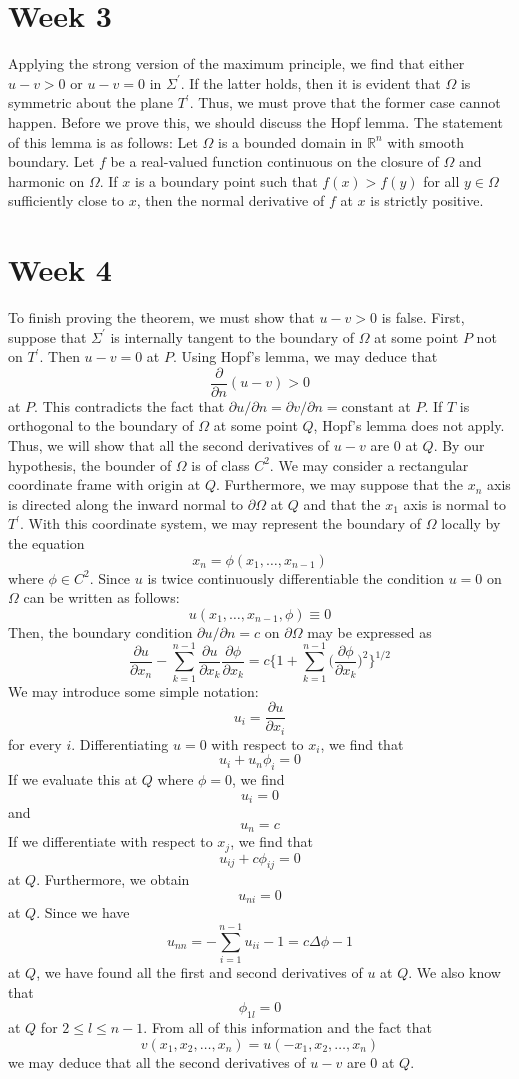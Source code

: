 \documentclass[12pt]{article}
\newcommand{\R}{\mathbb{R}}
\begin{document}
\section*{Week 3}
Applying the strong version of the maximum principle, we find that either $u-v > 0$ or $u-v = 0$ in $\Sigma^\prime$. If the latter holds, then it is evident that $\Omega$ is symmetric about the plane $T^\prime$. Thus, we must prove that the former case cannot happen. Before we prove this, we should discuss the Hopf lemma. The statement of this lemma is as follows: Let $\Omega$ is a bounded domain in $\R^n$ with smooth boundary. Let $f$ be a real-valued function continuous on the closure of $\Omega$ and harmonic on $\Omega$. If $x$ is a boundary point such that $f(x) > f(y)$ for all $y \in \Omega$ sufficiently close to $x$, then the normal derivative of $f$ at $x$ is strictly positive.
\section*{Week 4}
To finish proving the theorem, we must show that $u-v > 0$ is false. First, suppose that $\Sigma^\prime$ is internally tangent to the boundary of $\Omega$ at some point  $P$ not on $T^\prime$. Then $u - v = 0$ at $P$. Using Hopf's lemma, we may deduce that
\[
\frac{\partial}{\partial{n}}(u-v) > 0
\] at $P$. This contradicts the fact that $\partial{u}/\partial{n} = \partial{v}/\partial{n} = \text{constant}$ at $P$. If $T$ is orthogonal to the boundary of $\Omega$ at some point $Q$, Hopf's lemma does not apply. Thus, we will show that all the second derivatives of $u-v$ are $0$ at $Q$. By our hypothesis, the bounder of $\Omega$ is of class $C^2$. We may consider a rectangular coordinate frame with origin at $Q$. Furthermore, we may suppose that the $x_n$ axis is directed along the inward normal to $\partial{\Omega}$ at $Q$ and that the $x_1$ axis is normal to $T^\prime$. With this coordinate system, we may represent the boundary of $\Omega$ locally by the equation
\[
x_n = \phi(x_1,\ldots,x_{n-1})
\] where $\phi \in C^2$. Since $u$ is twice continuously differentiable the condition $u = 0$ on $\Omega$ can be written as follows:
\[
u(x_1,\ldots,x_{n-1},\phi) \equiv 0
\] Then, the boundary condition $\partial{u}/\partial{n} = c$ on $\partial{\Omega}$ may be expressed as
\[
\frac{\partial{u}}{\partial{x_n}} - \sum_{k=1}^{n-1} \frac{\partial{u}}{\partial{x_k}}\frac{\partial{\phi}}{\partial{x_k}} = c \Bigg\{ 1 + \sum_{k=1}^{n-1} \bigg(\frac{\partial{\phi}}{\partial{x_k}}\bigg)^2\Bigg\}^{1/2}
\] We may introduce some simple notation:
\[
u_i = \frac{\partial{u}}{\partial{x_i}}
\] for every $i$. Differentiating $u = 0$ with respect to $x_i$, we find that
\[
u_i + u_n \phi_i = 0
\] If we evaluate this at $Q$ where $\phi = 0$, we find
\[
u_i = 0
\] and 
\[
u_n = c
\] If we differentiate with respect to $x_j$, we find that
\[
u_{ij} + c\phi_{ij} = 0
\] at $Q$. Furthermore, we obtain
\[
u_{ni} = 0
\] at $Q$. Since we have 
\[
u_{nn} = - \sum_{i=1}^{n-1} u_{ii} - 1 = c \Delta \phi - 1
\] at $Q$, we have found all the first and second derivatives of $u$ at $Q$. We also know that
\[
\phi_{1l} = 0
\] at $Q$ for $2 \leq l \leq n-1$. From all of this information and the fact that
\[
v(x_1,x_2,\ldots,x_n) = u(-x_1,x_2,\ldots,x_n)
\] we may deduce that all the second derivatives of $u-v$ are $0$ at $Q$.
\end{document}
